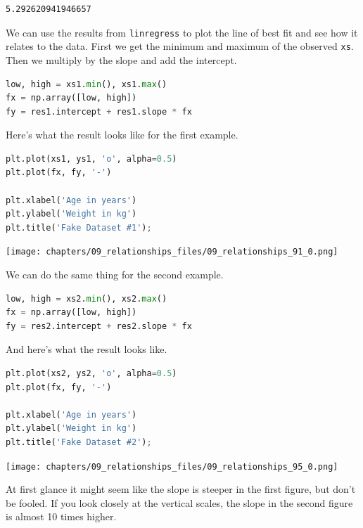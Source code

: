 \begin{lstlisting}[style=output]
5.292620941946657
\end{lstlisting}

We can use the results from \passthrough{\lstinline!linregress!} to plot
the line of best fit and see how it relates to the data. First we get
the minimum and maximum of the observed \passthrough{\lstinline!xs!}.
Then we multiply by the slope and add the intercept.

\begin{lstlisting}[language=Python,style=source]
low, high = xs1.min(), xs1.max()
fx = np.array([low, high])
fy = res1.intercept + res1.slope * fx
\end{lstlisting}

Here's what the result looks like for the first example.

\begin{lstlisting}[language=Python,style=source]
plt.plot(xs1, ys1, 'o', alpha=0.5)
plt.plot(fx, fy, '-')

plt.xlabel('Age in years')
plt.ylabel('Weight in kg')
plt.title('Fake Dataset #1');
\end{lstlisting}

\begin{center}
\texttt{[image: chapters/09\_relationships\_files/09\_relationships\_91\_0.png]}
\end{center}

We can do the same thing for the second example.

\begin{lstlisting}[language=Python,style=source]
low, high = xs2.min(), xs2.max()
fx = np.array([low, high])
fy = res2.intercept + res2.slope * fx
\end{lstlisting}

And here's what the result looks like.

\begin{lstlisting}[language=Python,style=source]
plt.plot(xs2, ys2, 'o', alpha=0.5)
plt.plot(fx, fy, '-')

plt.xlabel('Age in years')
plt.ylabel('Weight in kg')
plt.title('Fake Dataset #2');
\end{lstlisting}

\begin{center}
\texttt{[image: chapters/09\_relationships\_files/09\_relationships\_95\_0.png]}
\end{center}

At first glance it might seem like the slope is steeper in the first
figure, but don't be fooled. If you look closely at the vertical scales,
the slope in the second figure is almost 10 times higher.

